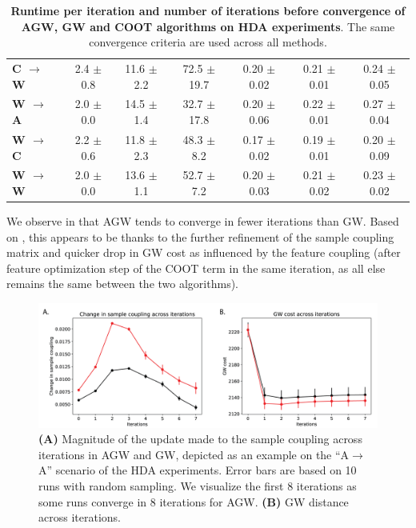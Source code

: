 \begin{table}[t]
\begin{tabular}{@{}lccc|ccc@{}}
\textbf{C $\rightarrow$ W} & 2.4 $\pm$ 0.8               & 11.6 $\pm$ 2.2              & 72.5 $\pm$ 19.7         & 0.20 $\pm$ 0.02         & 0.21 $\pm$ 0.01             & 0.24 $\pm$ 0.05         \\
\textbf{W $\rightarrow$ A} & 2.0 $\pm$ 0.0              & 14.5 $\pm$ 1.4              & 32.7 $\pm$ 17.8          & 0.20 $\pm$ 0.06         & 0.22 $\pm$ 0.01             & 0.27 $\pm$ 0.04         \\
\textbf{W $\rightarrow$ C} & 2.2 $\pm$ 0.6               & 11.8 $\pm$ 2.3              & 48.3 $\pm$ 8.2           & 0.17 $\pm$ 0.02         & 0.19 $\pm$ 0.01             & 0.20 $\pm$ 0.09         \\
\textbf{W $\rightarrow$ W}  & 2.0 $\pm$ 0.0               & 13.6 $\pm$ 1.1              & 52.7 $\pm$ 7.2          & 0.20 $\pm$ 0.03        & 0.21 $\pm$ 0.02             & 0.23 $\pm$ 0.02 \\ \bottomrule
\end{tabular}
\caption{\label{tabSI:runtime}
\textbf{Runtime per iteration and number of iterations before convergence of AGW, GW and COOT
algorithms on HDA experiments}. The same convergence criteria are used across all methods.}
\end{table}

We observe in  that AGW tends to converge in fewer iterations than GW.
Based on , this appears to be thanks to the further refinement of
the sample coupling matrix and quicker drop in GW cost as influenced by the feature coupling
(after feature optimization step of the COOT term in the same iteration,
as all else remains the same between the two algorithms).
\begin{figure}[h]
    \centering
    \includegraphics[width=\linewidth]{./Chapitre5/fig/timing_plots.png}
    \caption{\label{fig:SI-timing} \textbf{(A)} Magnitude of the update made to the sample coupling
    across iterations in AGW and GW, depicted as an example on the ``A$\rightarrow$A''
    scenario of the HDA experiments. Error bars are based on 10 runs with random sampling.
    We visualize the first 8 iterations as some runs converge in 8 iterations for AGW.
    \textbf{(B)} GW distance across iterations.}
\end{figure}